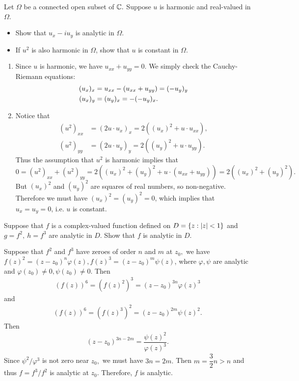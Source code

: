 \begin{problem}
Let $\Omega$ be a connected open subset of $\mathbb{C}.$ Suppose $u$ is harmonic and real-valued in $\Omega.$
\begin{itemize}
    \item[(a)] Show that $u_x - iu_y$ is analytic in $\Omega$. 
    \item[(b)] If $u^2$ is also harmonic in $\Omega$, show that $u$ is constant in $\Omega$.
\end{itemize}
\begin{solution}
\begin{enumerate}
    \item[(a)] Since $u$ is harmonic, we have $u_{xx} + u_{yy} = 0$.
    We simply check the Cauchy-Riemann equations:
    \begin{align*}
        (u_x)_x &= u_{xx} - \left( u_{xx} + u_{yy}\right) = (-u_y)_y \\
        (u_x)_y &= (u_y)_x = -(-u_y)_x.
    \end{align*}
    \item[(b)] Notice that
    \begin{align*}
        (u^2)_{xx} &= (2u \cdot u_x)_x = 2((u_x)^2 + u \cdot u_{xx}), \\
        (u^2)_{yy} &= (2u \cdot u_y)_y = 2((u_y)^2 + u \cdot u_{yy}).
    \end{align*}
    Thus the assumption that $u^2$ is harmonic implies that
    $$ 0 = (u^2)_{xx} + (u^2)_{yy} = 2((u_x)^2 + (u_y)^2 + u \cdot (u_{xx} + u_{yy})) = 2((u_x)^2 + (u_y)^2). $$
    But $(u_x)^2$ and $(u_y)^2$ are squares of real numbers, so non-negative. Therefore we must have $(u_x)^2 = (u_y)^2 = 0$, which implies that $u_x = u_y = 0$, i.e. $u$ is constant.
\end{enumerate}
\end{solution}
\end{problem}

\begin{problem}
Suppose that $f$ is a complex-valued function defined on $D=\left\{ z:|z|<1\right\}$ and $g=f^2,\ h=f^3$ are analytic in $D.$ Show that $f$ is analytic in $D.$
\begin{solution}
Suppose that $f^2$ and $f^3$ have zeroes of order $n$ and $m$ at $z_0,$ we have $f(z)^2=(z-z_0)^n\varphi(z),f(z)^3=(z-z_0)^m\psi(z)$, where $\varphi,\psi$ are analytic and $\varphi(z_0)\ne 0,\psi(z_0)\ne 0.$ Then 
\begin{align*}
    (f(z))^6=(f(z)^2)^3=(z-z_0)^{3n}\varphi(z)^3
\end{align*}
and 
\begin{align*}
    (f(z))^6=(f(z)^3)^2=(z-z_0)^{2m}\psi(z)^2.
\end{align*}
Then 
\begin{align*}
    (z-z_0)^{3n-2m}=\dfrac{\psi(z)^2}{\varphi(z)^3}.
\end{align*}
Since $\psi^2/\varphi^3$ is not zero near $z_0,$ we must have $3n=2m.$ Then $m=\dfrac{3}{2}n>n$ and thus $f=f^3/f^2$ is analytic at $z_0.$ Therefore, $f$ is analytic.
\end{solution}
\end{problem}
